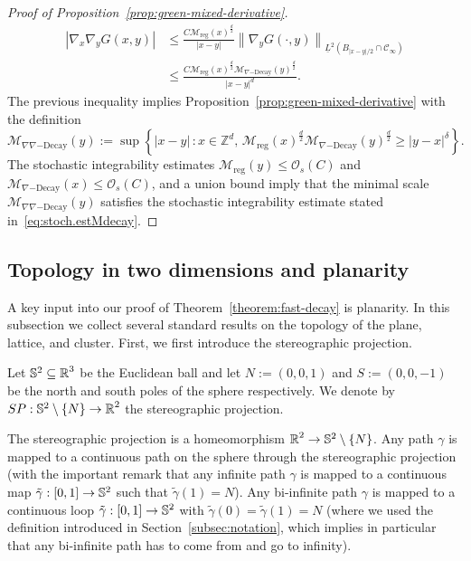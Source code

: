 \documentclass[12pt]{amsart}
\numberwithin{equation}{section}
\begin{document}
\begin{proof}[Proof of Proposition~\ref{prop:green-mixed-derivative}]
		\begin{align*}
			\left| \nabla_x \nabla_y G(x , y) \right| & \leq \frac{C \mathcal{M}_{\mathrm{reg}}(x)^{\frac{d}{2}} 
			}{|x-y|} \left\| \nabla_y G(\cdot , y) \right\|_{\underline{L}^2 \left(B_{|x - y|/2} \cap \mathscr{C}_{\infty} \right)} \\
			& \leq \frac{C \mathcal{M}_{\mathrm{reg}}(x)^{\frac{d}{2}} \mathcal{M}_{\nabla\mathrm{-Decay}}(y)^{\frac{d}{2}}}{|x-y|^d}.
		\end{align*}
		The previous inequality implies Proposition~\ref{prop:green-mixed-derivative} with the definition
		\begin{equation*}
			\mathcal{M}_{\nabla\nabla\mathrm{-Decay}}(y) := \sup \left\{ |x - y| \, : x \in \mathbb{Z}^d, \, \mathcal{M}_{\mathrm{reg}}(x)^{\frac{d}{2}} \mathcal{M}_{\nabla\mathrm{-Decay}}(y)^{\frac{d}{2}} \geq |y - x|^\delta \right\}.
		\end{equation*}
		The stochastic integrability estimates $\mathcal{M}_{\mathrm{reg}}(y) \leq \mathcal{O}_s(C)$ and $\mathcal{M}_{\nabla\mathrm{-Decay}}(x)\leq \mathcal{O}_s(C)$, and a union bound imply that the minimal scale $\mathcal{M}_{\nabla\nabla\mathrm{-Decay}}(y) $ satisfies the stochastic integrability estimate stated in~\eqref{eq:stoch.estMdecay}.
	\end{proof}
	
	\subsection{Topology in two dimensions and planarity}
	A key input into our proof of Theorem~\ref{theorem:fast-decay} is planarity.  In this subsection we collect several standard results on the topology of the plane, lattice, and cluster. First, we first introduce the stereographic projection.
	
	\begin{definition}
		Let $\S^2 \subseteq \R^3$ be the Euclidean ball and let $N := (0,0,1)$ and $S := (0,0,-1)$ be the north and south poles of the sphere respectively.
		We denote by $SP : \S^2 \setminus \left\{ N \right\}  \to \R^2$ the stereographic projection. 
	\end{definition}
	
	The stereographic projection is a homeomorphism $\R^2 \to \S^2 \setminus \left\{ N \right\}$. Any path $\gamma$ is mapped to a continuous path on the sphere through the stereographic projection (with the important remark that any infinite path $\gamma$ is mapped to a continuous map $\tilde \gamma :[0 , 1] \to \S^2$ such that $\tilde \gamma(1) = N$). Any bi-infinite path $\gamma$ is mapped to a continuous loop $\tilde \gamma :[0 , 1] \to \S^2$ with $\tilde \gamma(0) = \tilde \gamma(1) = N$ (where we used the definition introduced in Section~\ref{subsec:notation}, which implies in particular that any bi-infinite path has to come from and go to infinity).
	
\end{document}
